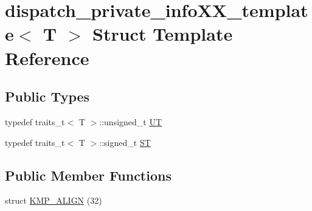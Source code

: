 \hypertarget{structdispatch__private__infoXX__template}{\section{dispatch\-\_\-private\-\_\-info\-X\-X\-\_\-template$<$ T $>$ Struct Template Reference}
\label{structdispatch__private__infoXX__template}
}
\subsection*{Public Types}
\begin{DoxyCompactItemize}
\item 
typedef traits\-\_\-t$<$ T $>$\-::unsigned\-\_\-t \hyperlink{structdispatch__private__infoXX__template_a36c3bad85f8de302d9d6692f5e365adc}{U\-T}
\item 
typedef traits\-\_\-t$<$ T $>$\-::signed\-\_\-t \hyperlink{structdispatch__private__infoXX__template_afec493a50230162ebb49ef3b83da3b43}{S\-T}
\end{DoxyCompactItemize}
\subsection*{Public Member Functions}
\begin{DoxyCompactItemize}
\item 
struct \hyperlink{structdispatch__private__infoXX__template_accda0d7fe1826b85ac9b0bef78f64407}{K\-M\-P\-\_\-\-A\-L\-I\-G\-N} (32)
\end{DoxyCompactItemize}
